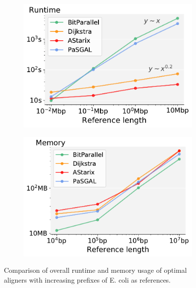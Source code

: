 \begin{figure}[t]
  \begin{subfigure}{.49\textwidth}
    \centering
    \includegraphics[width=\linewidth]{figs/cmp/performance_vs_genomesize-head_Mbpxs.pdf}
  \end{subfigure}
  \begin{subfigure}{.49\textwidth}
    \centering
    \includegraphics[width=\linewidth]{figs/cmp/memory_vs_genomesize-headxmax_rss.pdf}
  \end{subfigure}
  \caption{Comparison of overall runtime and memory usage of optimal aligners
     with increasing prefixes of E. coli as references.}
  \label{TRIEfig:scaling_with_graphsize}
\end{figure}
